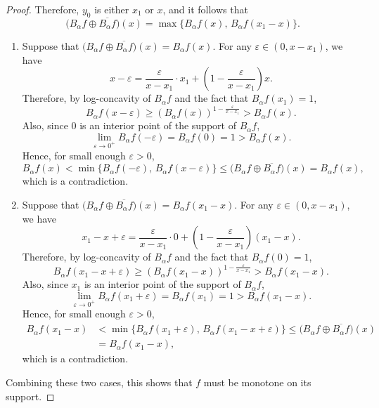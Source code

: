 \documentclass[11pt]{amsart}
\theoremstyle{plain}
\theoremstyle{definition}
\theoremstyle{remark}
\begin{document}
\begin{proof}
    Therefore, $y_0$ is either $x_1$ or $x$, and it follows that
    \[
        \bigl(B_\alpha f \oplus \overline{B_\alpha f}\bigr)(x)
        =
        \max\{B_\alpha f(x),\,B_\alpha f(x_1-x)\}.
    \]
\begin{enumerate}[wide =0pt, labelwidth= .9cm, leftmargin=1.55cm, label=\textbf{Case \arabic*}:]
        \item Suppose that $\bigl(B_\alpha f \oplus \overline{B_\alpha f}\bigr)(x)=B_\alpha f(x)$. For any $ \varepsilon \in (0,x-x_1) $, we have
        \[
            x-\varepsilon=\frac{\varepsilon}{x-x_1} \cdot x_1+\left(1-\frac{\varepsilon}{x-x_1}\right) x.
        \]
        Therefore, by log-concavity of $B_\alpha f$ and the fact that $B_\alpha f (x_1) = 1$,
        \[
            B_\alpha f\left(x-\varepsilon\right) \geq  (B_\alpha f (x))^{1-\frac{\varepsilon}{x-x_1}} > B_\alpha f (x).
        \]
        Also, since $0$ is an interior point of the support of $B_\alpha f$,
        $$
            \lim_{\varepsilon \to 0^+} B_\alpha f (-\varepsilon) = B_\alpha f (0) = 1 > B_\alpha f (x).
        $$
        Hence, for small enough $\varepsilon >0$,
        \[
            B_\alpha f(x) < \min\{B_\alpha f(-\varepsilon),\,B_\alpha f(x-\varepsilon)\} \leq \bigl(B_\alpha f \oplus \overline{B_\alpha f}\bigr)(x) = B_\alpha f (x),
        \]
         which is a contradiction.
         \item Suppose that $\bigl(B_\alpha f \oplus \overline{B_\alpha f}\bigr)(x)=B_\alpha f(x_1-x)$. For any $ \varepsilon \in (0,x-x_1) $, we have
        \[
            x_1-x+\varepsilon=\frac{\varepsilon}{x-x_1} \cdot 0+\left(1-\frac{\varepsilon}{x-x_1}\right) (x_1-x).
        \]
        Therefore, by log-concavity of $B_\alpha f$ and the fact that $B_\alpha f (0) = 1$,
        \[
            B_\alpha f\left(x_1-x+\varepsilon\right) \geq  (B_\alpha f (x_1-x))^{1-\frac{\varepsilon}{x-x_1}} > B_\alpha f (x_1-x).
        \]
        Also, since $x_1$ is an interior point of the support of $B_\alpha f$,
        $$
            \lim_{\varepsilon \to 0^+} B_\alpha f (x_1+\varepsilon) = B_\alpha f (x_1) = 1 > B_\alpha f (x_1-x).
        $$
        Hence, for small enough $\varepsilon>0$,
        \begin{align}
            B_\alpha f(x_1-x) &< \min\{B_\alpha f(x_1+\varepsilon),\,B_\alpha f(x_1-x+\varepsilon)\} \leq \bigl(B_\alpha f \oplus \overline{B_\alpha f}\bigr)(x)
            \\
            &= B_\alpha f (x_1-x),
        \end{align}
         which is a contradiction.
    \end{enumerate}
    Combining these two cases, this shows that $f$ must be monotone on its support. \qedhere
\end{proof}
\end{document}
